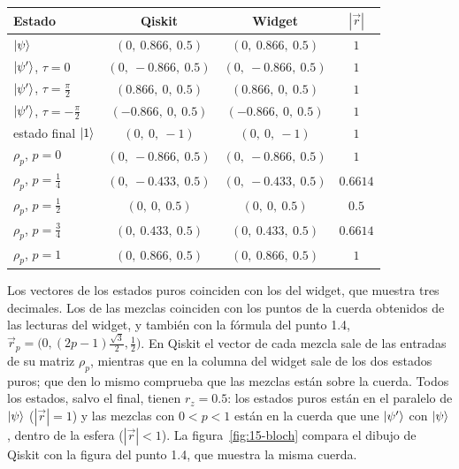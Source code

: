 \begin{center}
\renewcommand{\arraystretch}{1.3}
\begin{tabular}{lccc}
  Estado & Qiskit & Widget & $|\vec r|$\\\hline
  $\lvert \psi\rangle$ & $(0,\ 0.866,\ 0.5)$ & $(0,\ 0.866,\ 0.5)$ & $1$\\
  $\lvert \psi'\rangle$, $\tau=0$ & $(0,\ -0.866,\ 0.5)$ & $(0,\ -0.866,\ 0.5)$ & $1$\\
  $\lvert \psi'\rangle$, $\tau=\frac\pi2$ & $(0.866,\ 0,\ 0.5)$ & $(0.866,\ 0,\ 0.5)$ & $1$\\
  $\lvert \psi'\rangle$, $\tau=-\frac\pi2$ & $(-0.866,\ 0,\ 0.5)$ & $(-0.866,\ 0,\ 0.5)$ & $1$\\
  estado final $\lvert 1\rangle$ & $(0,\ 0,\ -1)$ & $(0,\ 0,\ -1)$ & $1$\\\hline
  $\rho_p$, $p=0$ & $(0,\ -0.866,\ 0.5)$ & $(0,\ -0.866,\ 0.5)$ & $1$\\
  $\rho_p$, $p=\frac14$ & $(0,\ -0.433,\ 0.5)$ & $(0,\ -0.433,\ 0.5)$ & $0.6614$\\
  $\rho_p$, $p=\frac12$ & $(0,\ 0,\ 0.5)$ & $(0,\ 0,\ 0.5)$ & $0.5$\\
  $\rho_p$, $p=\frac34$ & $(0,\ 0.433,\ 0.5)$ & $(0,\ 0.433,\ 0.5)$ & $0.6614$\\
  $\rho_p$, $p=1$ & $(0,\ 0.866,\ 0.5)$ & $(0,\ 0.866,\ 0.5)$ & $1$
\end{tabular}
\end{center}

Los vectores de los estados puros coinciden con los del widget, que muestra tres decimales. Los
de las mezclas coinciden con los puntos de la cuerda obtenidos de las lecturas del widget, y
también con la fórmula del punto 1.4, $\vec r_p=\bigl(0,(2p-1)\frac{\sqrt3}{2},\frac12\bigr)$.
En Qiskit el vector de cada mezcla sale de las entradas de su matriz $\rho_p$, mientras que en la
columna del widget sale de los dos estados puros; que den lo mismo comprueba que las mezclas
están sobre la cuerda. Todos los estados, salvo el final, tienen $r_z=0.5$: los estados puros
están en el paralelo de $\lvert \psi\rangle$ ($|\vec r|=1$) y las mezclas con $0<p<1$ están en la cuerda
que une $\lvert \psi'\rangle$ con $\lvert \psi\rangle$, dentro de la esfera ($|\vec r|<1$). La
figura~\ref{fig:15-bloch} compara el dibujo de Qiskit con la figura del punto 1.4, que muestra la misma cuerda.

